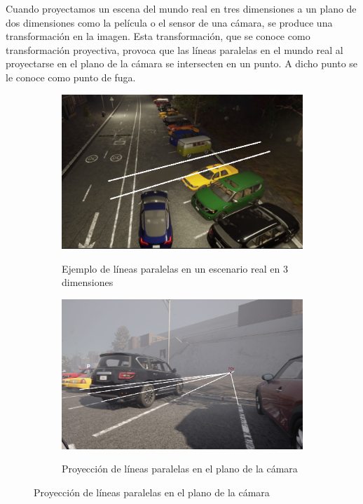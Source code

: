\noindent
Cuando proyectamos un escena del mundo real en tres dimensiones a un plano de dos dimensiones como la película o el sensor de una cámara, se produce una transformación en la imagen.
Esta transformación, que se conoce como transformación proyectiva, provoca que las líneas paralelas en el mundo real al proyectarse en el plano de la cámara se intersecten en un punto. A dicho punto se le conoce como punto de fuga.

\begin{figure}[!ht]
    \centering
    \begin{subfigure}{0.4\textwidth}
        \includegraphics[width=\textwidth]{img/reticule/paralel_lines}\label {fig:parallel_lines}
        \caption{Ejemplo de líneas paralelas en un escenario real en 3 dimensiones}
    \end{subfigure}
    \begin{subfigure}{0.4\textwidth}
        \includegraphics[width=\textwidth]{img/reticule/pov}\label {fig:pov}
        \caption{Proyección de líneas paralelas en el plano de la cámara}
    \end{subfigure}

    \label{fig:distorion}
\end{figure}

